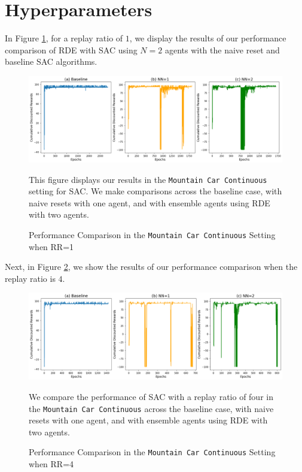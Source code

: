 \documentclass[base]{subfiles}
\begin{document}
\section{Hyperparameters}\label{app:c}

In Figure \ref{fig:mc_rr1}, for a replay ratio of $1$, we display the results of our performance comparison of RDE with SAC using $N=2$ agents with the naive reset and baseline SAC algorithms.

\begin{figure}[h!]
	\centering
	\caption{Performance Comparison in the \texttt{Mountain Car Continuous} Setting when RR=1}
	\label{fig:mc_rr1}
	\includegraphics[width = 1 \linewidth]{mc_RR1.png}
	\begin{flushleft} This figure displays our results in the \texttt{Mountain Car Continuous} setting for SAC. We make comparisons across the baseline case, with naive resets with one agent, and with ensemble agents using RDE with two agents. \end{flushleft}
\end{figure}

Next, in Figure \ref{fig:mc_rr4}, we show the results of our performance comparison when the replay ratio is $4$.

\begin{figure}[h!]
	\centering
	\caption{Performance Comparison in the \texttt{Mountain Car Continuous} Setting when RR=4}
	\label{fig:mc_rr4}
	\includegraphics[width = 1 \linewidth]{mc_RR4.png}
	\begin{flushleft} We compare the performance of SAC with a replay ratio of four in the \texttt{Mountain Car Continuous} across the baseline case, with naive resets with one agent, and with ensemble agents using RDE with two agents. \end{flushleft}
\end{figure}
\end{document}
